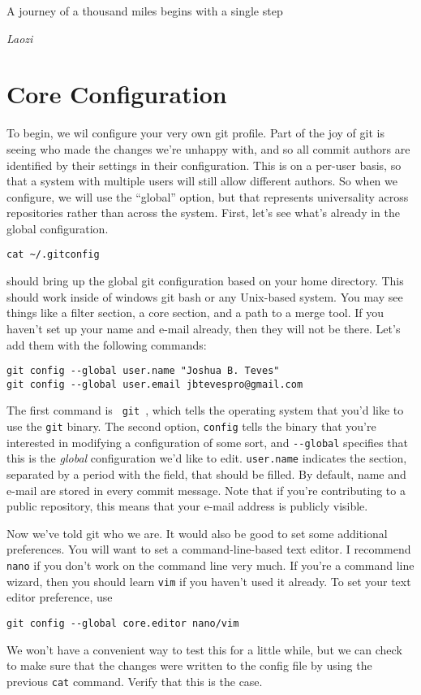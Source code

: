 \epigraph{A journey of a thousand miles begins with a single
step}{\textit{Laozi}}

\section{Core Configuration}
\par{
To begin, we wil configure your very own git profile. Part of the joy of git
is seeing who made the changes we're unhappy with, and so all commit authors
are identified by their settings in their configuration. This is on a per-user
basis, so that a system with multiple users will still allow different
authors. So when we configure, we will use the ``global'' option, but that
represents universality across repositories rather than across the system.
First, let's see what's already in the global configuration.

\begin{verbatim}
cat ~/.gitconfig
\end{verbatim}

should bring up the global git configuration based on your home directory.
This should work inside of windows git bash or any Unix-based system.
You may see things like a filter section, a core section, and a path to a
merge tool. If you haven't set up your name and e-mail already, then they will
not be there. Let's add them with the following commands:

\begin{verbatim}
git config --global user.name "Joshua B. Teves"
git config --global user.email jbtevespro@gmail.com
\end{verbatim}

The first command is \verb+ git +, which tells the
operating system that you'd like to use the \verb+git+
binary. The second option, \verb+config+ 
tells the binary that you're interested in modifying a
configuration of some sort, and \verb+--global+ specifies
that this is the \emph{global} configuration we'd like to edit. 
\verb+user.name+ indicates the section, separated by
a period with the field, that should be filled. By default, name and e-mail
are stored in every commit message. Note that if you're contributing to a
public repository, this means that your e-mail address is publicly visible. 
}

\par{
Now we've told git who we are. It would also be good to set some additional
preferences. You will want to set a command-line-based text editor. I
recommend \verb+nano+ if you don't work on the
command line very much. If you're a command line wizard, then you should learn
\verb+vim+ if you haven't used it already. To set
your text editor preference, use

\begin{verbatim}
git config --global core.editor nano/vim
\end{verbatim}

We won't have a convenient way to test this for a little while, but we can
check to make sure that the changes were written to the config file by using
the previous \verb+cat+ command. Verify that this is the case. 
}

